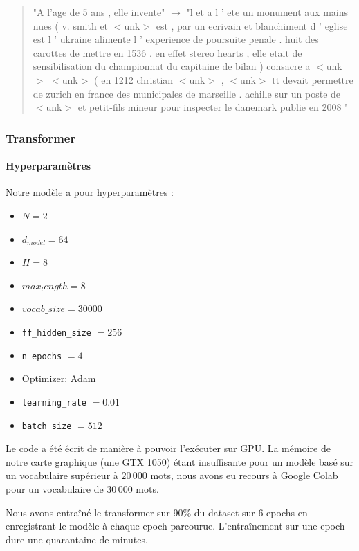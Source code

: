\begin{quotation}
"A l'age de 5 ans , elle invente" $\rightarrow$ "l et a l ' ete un monument aux mains nues ( v. smith et $<$unk$>$ est , par un ecrivain et blanchiment d ' eglise est l ' ukraine alimente l ' experience de poursuite penale . huit des carottes de mettre en 1536 . en effet stereo hearts , elle etait de sensibilisation du championnat du capitaine de bilan ) consacre a $<$unk$>$ $<$unk$>$ ( en 1212 christian $<$unk$>$ , $<$unk$>$ tt devait permettre de zurich en france des municipales de marseille . achille sur un poste de $<$unk$>$ et petit-fils mineur pour inspecter le danemark publie en 2008 "
\end{quotation}

\vspace{0.4cm}

\subsubsection{Transformer}

\paragraph{Hyperparamètres}

Notre modèle a pour hyperparamètres :
\begin{itemize}
\item
  \(N = 2\)
\item
  \(d_{model} = 64\)
\item
  \(H = 8\)
\item
  \(max_length = 8\)
\item
  \(vocab\_size = 30 000\)
\item
  \texttt{ff\_hidden\_size} $ = 256$
\item
  \texttt{n\_epochs} $ = 4$
\item
  Optimizer: Adam
\item
  \texttt{learning\_rate} $ = 0.01 $
\item
  \texttt{batch\_size} $ = 512 $
\end{itemize}

Le code a été écrit de manière à pouvoir l’exécuter sur GPU. La mémoire de notre carte graphique
(une GTX 1050) étant insuffisante pour un modèle basé sur un vocabulaire supérieur à
$20\,000$ mots, nous avons eu recours à Google Colab pour un vocabulaire de $30\,000$ mots.

Nous avons entraîné le transformer sur 90\% du dataset sur 6 epochs en enregistrant
le modèle à chaque epoch parcourue. L'entraînement sur une epoch dure une quarantaine de minutes.


